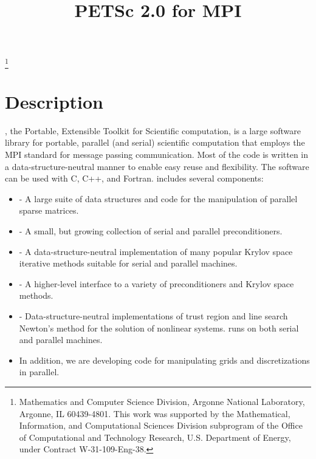 \pagestyle{empty}

\pagestyle{empty}
\title{PETSc 2.0 for MPI}
\thanks{Mathematics and Computer Science Division,
Argonne National Laboratory,
Argonne, IL 60439-4801.
This work was supported by the Mathematical,
        Information, and Computational Sciences Division subprogram of
        the Office of Computational and Technology Research,
        U.S. Department of Energy, under Contract W-31-109-Eng-38.}

\date{}
\maketitle

\section*{Description}

, the Portable, Extensible Toolkit for Scientific computation,
is a large software library for portable, parallel (and serial)
scientific computation that employs the MPI standard for message
passing communication.  Most of the code is written in a
data-structure-neutral manner to enable easy reuse and flexibility.
The  software can be used with C, C++, and Fortran.
 includes several components:
\begin{itemize}
\item {} - A large suite of data structures and code
      for the manipulation of parallel sparse matrices.
\item {} - A small, but growing collection of serial and parallel 
      preconditioners.
\item {} - A data-structure-neutral implementation of
      many popular Krylov space iterative methods suitable for 
      serial and parallel machines.
\item {} - A higher-level interface to a variety
      of preconditioners and Krylov space methods.
\item {} - Data-structure-neutral 
      implementations of trust region and line search Newton's 
      method for the solution of nonlinear systems.  runs 
      on both serial and parallel machines.  
\item In addition, we are developing code for manipulating grids
      and discretizations in parallel.
\end{itemize}

